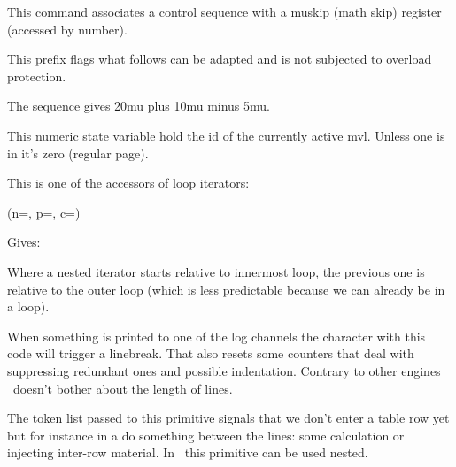 \startoldprimitive[title={\prm {muskipdef}}]

This command associates a control sequence with a muskip (math skip) register
(accessed by number).

\stopoldprimitive

\startnewprimitive[title={\prm {mutable}}]

This prefix flags what follows can be adapted and is not subjected to overload
protection.

\stopnewprimitive

\startoldprimitive[title={\prm {mutoglue}}]

The sequence  gives \the \mutoglue
20mu plus 10mu minus 5mu.

\stopoldprimitive

\startnewprimitive[title={\prm {mvlcurrentlyactive}}]

This numeric state variable hold the id of the currently active mvl. Unless one
is in  it's zero (regular page).

\stopnewprimitive

\startnewprimitive[title={\prm {nestedloopiterator}}]

This is one of the accessors of loop iterators:

\startbuffer
{} {%
     {%
        (n=\the{},
         p=\the{},
         c=\the\currentloopiterator)
    }%
}%
\stopbuffer

\typebuffer

Gives:

\getbuffer

Where a nested iterator starts relative to innermost loop, the previous one is
relative to the outer loop (which is less predictable because we can already be
in a loop).

\stopnewprimitive

\startoldprimitive[title={\prm {newlinechar}}]

When something is printed to one of the log channels the character with this code
will trigger a linebreak. That also resets some counters that deal with
suppressing redundant ones and possible indentation. Contrary to other engines
\LUAMETATEX\ doesn't bother about the length of lines.

\stopoldprimitive

\startoldprimitive[title={\prm {noalign}}]

The token list passed to this primitive signals that we don't enter a table row
yet but for instance in a  do something between the lines: some
calculation or injecting inter-row material. In \LUAMETATEX\ this primitive can
be used nested.

